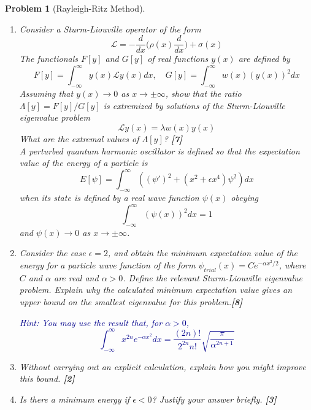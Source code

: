 \documentclass[a4paper]{article}
\theoremstyle{new}
\newtheorem{qns}{Problem}[section]
\begin{document}
\newpage
\begin{qns}[Rayleigh-Ritz Method]\leavevmode
\begin{enumerate}[label=(\alph*)]
\item Consider a Sturm-Liouville operator of the form
$$\mathcal{L}=-\frac{d}{dx}\bigg(\rho(x)\frac{d}{dx}\bigg)+\sigma(x)$$
The functionals $F[y]$ and $G[y]$ of real functions $y(x)$ are defined by
$$F[y]=\int_{-\infty}^\infty y(x)\mathcal{L}y(x)dx,\quad G[y]=\int_{-\infty}^\infty w(x)(y(x))^2dx$$
Assuming that $y(x)\rightarrow 0$ as $x\rightarrow\pm\infty$, show that the ratio $\Lambda[y] = F[y]/G[y]$ is extremized by solutions of the Sturm-Liouville eigenvalue problem
$$\mathcal{L}y(x)=\lambda w(x)y(x)$$
What are the extremal values of $\Lambda[y]$? \hfill\textbf{[7]}\\[5pt]
A perturbed quantum harmonic oscillator is defined so that the expectation value of the energy of a particle is
$$E[\psi]=\int_{-\infty}^\infty((\psi')^2+(x^2+\epsilon x^4)\psi^2)dx$$
when its state is defined by a real wave function $\psi(x)$ obeying
$$\int_{-\infty}^\infty(\psi(x))^2dx=1$$
and $\psi(x)\rightarrow 0$ as $x\rightarrow\pm\infty$.
\item Consider the case $\epsilon=2$, and obtain the minimum expectation value of the energy for a particle wave function of the form  $\psi_{trial}(x) = C e^{-\alpha x^2/2}$, where $C$ and $\alpha$ are real and $\alpha>0$. Define the relevant Sturm-Liouville eigenvalue problem. Explain why the calculated minimum expectation value gives an upper bound on the smallest eigenvalue for this problem.\hfill\textbf{[8]}

\begin{mdframed}
\textcolor{darkblue}{Hint: You may use the result that, for $\alpha>0$,
$$\int_{-\infty}^\infty x^{2n}e^{-\alpha x^2}dx=\frac{(2n)!}{2^{2n}n!}\sqrt{\frac{\pi}{\alpha^{2n+1}}}$$}
\end{mdframed}
\item Without carrying out an explicit calculation, explain how you might improve this bound. \hfill\textbf{[2]}
\item Is there a minimum energy if $\epsilon<0$? Justify your answer briefly. \hfill\textbf{[3]}
\end{enumerate}
\end{qns}
\newpage
\end{document}
